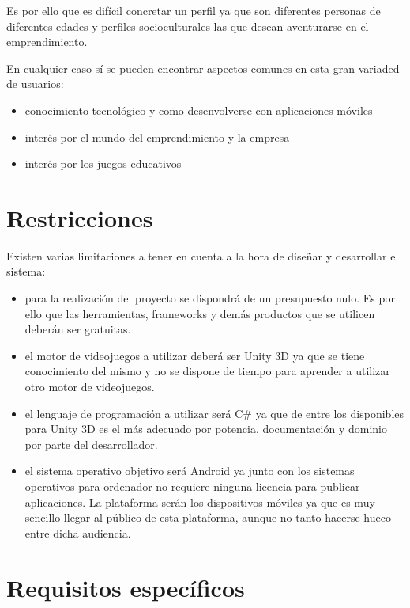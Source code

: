 Es por ello que es difícil concretar un perfil ya que son diferentes personas de diferentes edades y perfiles socioculturales las que desean aventurarse en el emprendimiento.

En cualquier caso sí se pueden encontrar aspectos comunes en esta gran variaded de usuarios:

\begin{itemize}

\item conocimiento tecnológico y como desenvolverse con aplicaciones móviles
\item interés por el mundo del emprendimiento y la empresa
\item interés por los juegos educativos

\end{itemize}

\section{Restricciones}

Existen varias limitaciones a tener en cuenta a la hora de diseñar y desarrollar el sistema:

\begin{itemize}

\item para la realización del proyecto se dispondrá de un presupuesto nulo. Es por ello que las herramientas, frameworks y demás productos que se utilicen deberán ser gratuitas.
\item el motor de videojuegos a utilizar deberá ser Unity 3D ya que se tiene conocimiento del mismo y no se dispone de tiempo para aprender a utilizar otro motor de videojuegos.
\item el lenguaje de programación a utilizar será C\# ya que de entre los disponibles para Unity 3D es el más adecuado por potencia, documentación y dominio por parte del desarrollador.
\item el sistema operativo objetivo será Android ya junto con los sistemas operativos para ordenador no requiere ninguna licencia para publicar aplicaciones. La plataforma serán los dispositivos móviles ya que es muy sencillo llegar al público de esta plataforma, aunque no tanto hacerse hueco entre dicha audiencia.

\end{itemize}

\section{Requisitos específicos}

